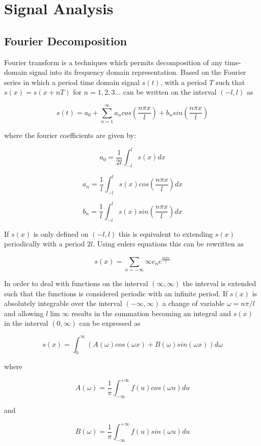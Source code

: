 \chapter{Signal Analysis}
\label{Chapter2}

\section{Fourier Decomposition}

Fourier transform is a techniques which permits decomposition of any time-domain signal into its frequency domain representation. Based on the Fourier series in which a period time domain signal $s(t)$, with a period $T$ such that $s(x)=s(x+nT)$ for $n=1,2,3 ...$ can be written on the interval $(-l,l)$ as

$$
s(t) = a_0 + \sum_{n=1}^{\infty} a_n cos(\frac{n\pi x}{l}) + b_n sin(\frac{n\pi x}{l})
$$

where the fourier coefficients are given by:

$$
a_0 = \frac{1}{2l}\int_{-l}^{l} s(x) dx
$$

$$
a_n = \frac{1}{l}\int_{-l}^{l} s(x) cos(\frac{n \pi x}{l}) dx
$$

$$
b_n = \frac{1}{l}\int_{-l}^{l} s(x) sin(\frac{n \pi x}{l}) dx
$$

If $s(x)$ is only defined on $(-l,l)$ this is equivalent to extending $s(x)$ periodically with a period $2l$. Using eulers equations this can be rewritten as

$$
s(x) = \sum_{n=-\infty}{\infty} c_n e^{\frac{i n \pi x}{l}}
$$

In order to deal with functions on the interval $(\infty,\infty)$ the interval is extended such that the functions is considered periodic with an infinite period. If $s(x)$ is absolutely integrable over the interval $(-\infty,\infty)$ a change of variable $\omega = n \pi / l$ and allowing $l \lim \infty$ results in the summation becoming an integral and $s(x)$ in the interval $(0,\infty)$ can be expressed as 

$$
s(x) = \int_{0}^{\infty} \left( A(\omega) cos(\omega x) + B(\omega) sin(\omega x) \right) d\omega
$$

where 

$$
A(\omega) = \frac{1}{\pi} \int_{-\infty}^{+\infty} f(u) cos(\omega u) du
$$

and

$$
B(\omega) = \frac{1}{\pi} \int_{-\infty}^{+\infty} f(u) sin(\omega u) du
$$

